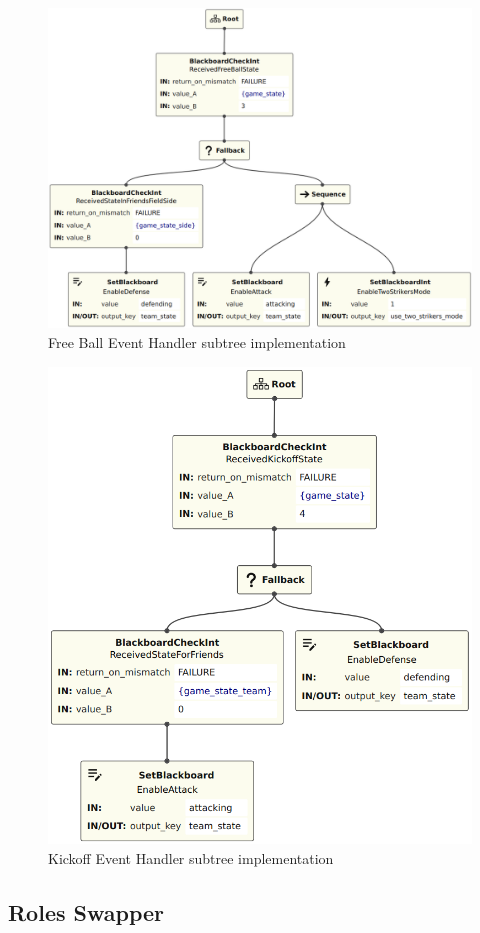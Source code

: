 \begin{figure}[!h]
    \centering
    \includegraphics[width=0.9\linewidth]{chapters/development/images/FreeBallEventHandler.png}
    \caption{Free Ball Event Handler subtree implementation}
    \label{fig:free_ball_event_handler_impl}
\end{figure}

\begin{figure}[!h]
    \centering
    \includegraphics[width=0.65\linewidth]{chapters/development/images/KickoffEventHandler.png}
    \caption{Kickoff Event Handler subtree implementation}
    \label{fig:kickoff_event_handler_impl}
\end{figure}

\subsection{Roles Swapper}

